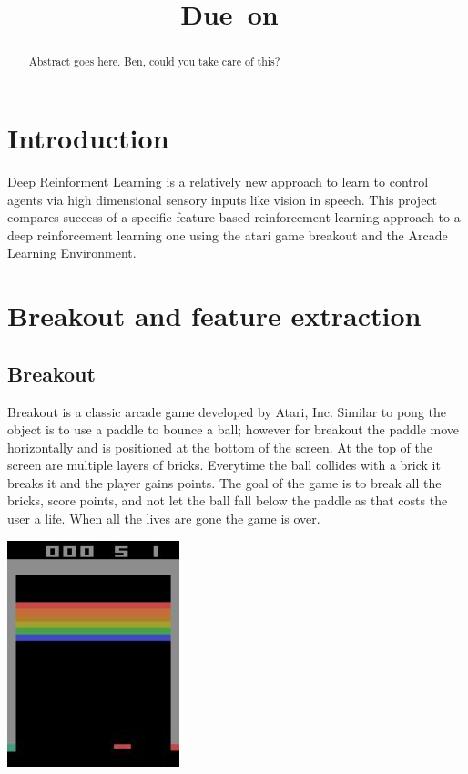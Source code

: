 \documentclass{article}
\title{
    \vspace{2in}
    \textmd{\textbf{\hmwkTitle}}\\
    \normalsize\vspace{0.1in}\small{Due\ on\ \hmwkDueDate}\\
    \vspace{0.1in}\large{\textit{\hmwkClassInstructor}}
    \vspace{3in}
}
\author{\textbf{\hmwkAuthorName}}
\date{}
\begin{document}
\maketitle

\pagebreak

\begin{abstract}
  Abstract goes here. Ben, could you take care of this?
\end{abstract}

\section{Introduction}
Deep Reinforment Learning is a relatively new approach to learn to control agents via high dimensional sensory inputs like vision in speech. This project compares success of a specific feature based reinforcement learning approach to a deep reinforcement learning one using the atari game breakout and the Arcade Learning Environment.

\section{Breakout and feature extraction}
\subsection{Breakout}
Breakout is a classic arcade game developed by Atari, Inc. Similar to pong the object is to use a paddle to bounce a ball; however for breakout the paddle move horizontally and is positioned at the bottom of the screen. At the top of the screen are multiple layers of bricks. Everytime the ball collides with a brick it breaks it and the player gains points. The goal of the game is to break all the bricks, score points, and not let the ball fall below the paddle as that costs the user a life. When all the lives are gone the game is over.

  \begin{center}
  \includegraphics[width=50mm]{tmp.jpg}
  \end{center}
\end{document}
